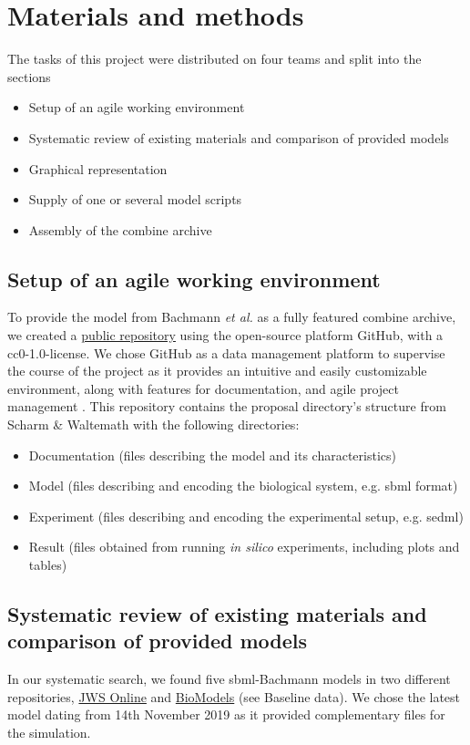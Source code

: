 \section*{Materials and methods} \label{sec:matmet}

The tasks of this project were distributed on  four teams and split into the sections 
\begin{itemize}
    \item Setup of an agile working environment
    \item Systematic review of existing materials and comparison of provided models
    \item Graphical representation
    \item Supply of one or several model scripts
    \item Assembly of the \acs{combine} archive
\end{itemize}

\subsection*{Setup of an agile working environment} \label{setupagwork}
To provide the model from Bachmann \textit{et al.} \cite{bachmannmodel} as a fully featured \ac{combine} archive, we created a \hyperref[https://github.com/ahodelin/Bachmann_Archive]{public repository} using the open-source platform GitHub, with a \ac{cc}0-1.0-license. We chose GitHub as a data management platform to supervise the course of the project as it provides an intuitive and easily customizable environment, along with features for documentation, and agile project management \cite{github}. This repository contains the proposal directory's structure from Scharm \& Waltemath \cite{combine} with the following directories:
\begin{itemize}
    \item Documentation (files describing the model and its characteristics)
    \item Model (files describing and encoding the biological system, e.g. \ac{sbml} format)
    \item Experiment (files describing and encoding the experimental setup, e.g. \ac{sedml})
    \item Result (files obtained from running \textit{in silico} experiments, including plots and tables)
\end{itemize}

\subsection*{Systematic review of existing materials and comparison of provided models}
In our systematic search, we found five \ac{sbml}-Bachmann models in two different repositories, \hyperlink{https://www.systemsmedicine.net/posts/jws-online-biological-systems-modelling}{JWS Online} and \hyperlink{https://www.ebi.ac.uk/biomodels/}{BioModels} (see Baseline data). We chose the latest model dating from 14th November 2019 as it provided complementary files for the simulation.

